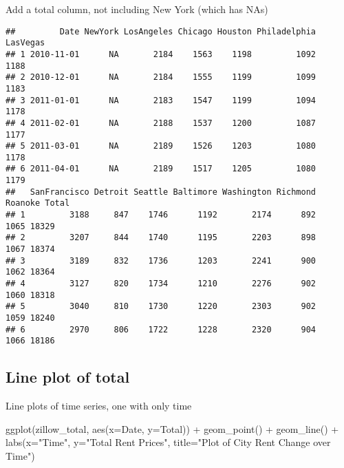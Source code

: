 \documentclass[
]{article}
\newenvironment{Shaded}{\begin{snugshade}}{\end{snugshade}}
\newcommand{\AttributeTok}[1]{\textcolor[rgb]{0.77,0.63,0.00}{#1}}
\newcommand{\DecValTok}[1]{\textcolor[rgb]{0.00,0.00,0.81}{#1}}
\newcommand{\FunctionTok}[1]{\textcolor[rgb]{0.00,0.00,0.00}{#1}}
\newcommand{\NormalTok}[1]{#1}
\newcommand{\OtherTok}[1]{\textcolor[rgb]{0.56,0.35,0.01}{#1}}
\newcommand{\SpecialCharTok}[1]{\textcolor[rgb]{0.00,0.00,0.00}{#1}}
\newcommand{\StringTok}[1]{\textcolor[rgb]{0.31,0.60,0.02}{#1}}
\begin{document}
Add a total column, not including New York (which has NAs)

\begin{Shaded}
\end{Shaded}

\begin{verbatim}
##         Date NewYork LosAngeles Chicago Houston Philadelphia LasVegas
## 1 2010-11-01      NA       2184    1563    1198         1092     1188
## 2 2010-12-01      NA       2184    1555    1199         1099     1183
## 3 2011-01-01      NA       2183    1547    1199         1094     1178
## 4 2011-02-01      NA       2188    1537    1200         1087     1177
## 5 2011-03-01      NA       2189    1526    1203         1080     1178
## 6 2011-04-01      NA       2189    1517    1205         1080     1179
##   SanFrancisco Detroit Seattle Baltimore Washington Richmond Roanoke Total
## 1         3188     847    1746      1192       2174      892    1065 18329
## 2         3207     844    1740      1195       2203      898    1067 18374
## 3         3189     832    1736      1203       2241      900    1062 18364
## 4         3127     820    1734      1210       2276      902    1060 18318
## 5         3040     810    1730      1220       2303      902    1059 18240
## 6         2970     806    1722      1228       2320      904    1066 18186
\end{verbatim}

\hypertarget{line-plot-of-total}{%
\subsection{Line plot of total}\label{line-plot-of-total}}

Line plots of time series, one with only time

\begin{Shaded}
\begin{Highlighting}[]
\FunctionTok{ggplot}\NormalTok{(zillow\_total, }\FunctionTok{aes}\NormalTok{(}\AttributeTok{x=}\NormalTok{Date, }\AttributeTok{y=}\NormalTok{Total)) }\SpecialCharTok{+} \FunctionTok{geom\_point}\NormalTok{() }\SpecialCharTok{+} \FunctionTok{geom\_line}\NormalTok{() }\SpecialCharTok{+} \FunctionTok{labs}\NormalTok{(}\AttributeTok{x=}\StringTok{"Time"}\NormalTok{, }\AttributeTok{y=}\StringTok{"Total Rent Prices"}\NormalTok{, }\AttributeTok{title=}\StringTok{"Plot of City Rent Change over Time"}\NormalTok{)}
\end{Highlighting}
\end{Shaded}
\end{document}
